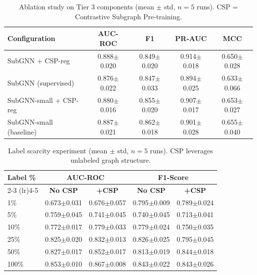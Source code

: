 \begin{table}[t]
\centering
\caption{Ablation study on Tier 3 components (mean $\pm$ std, $n=5$ runs). CSP = Contrastive Subgraph Pre-training.}
\label{tab:ablation}
\begin{tabular}{lcccc}
\toprule
\textbf{Configuration} & \textbf{AUC-ROC} & \textbf{F1} & \textbf{PR-AUC} & \textbf{MCC} \\
\midrule
SubGNN + CSP-reg               & 0.888$\pm$0.020 & 0.849$\pm$0.020 & 0.914$\pm$0.018 & 0.650$\pm$0.028 \\
SubGNN (supervised)            & 0.876$\pm$0.022 & 0.847$\pm$0.033 & 0.894$\pm$0.025 & 0.633$\pm$0.066 \\
SubGNN-small + CSP-reg         & 0.880$\pm$0.016 & 0.855$\pm$0.020 & 0.907$\pm$0.017 & 0.653$\pm$0.027 \\
SubGNN-small (baseline)        & 0.887$\pm$0.021 & 0.862$\pm$0.018 & 0.901$\pm$0.028 & 0.655$\pm$0.040 \\
\bottomrule
\end{tabular}
\end{table}

\begin{table}[t]
\centering
\caption{Label scarcity experiment (mean $\pm$ std, $n=5$ runs). CSP leverages unlabeled graph structure.}
\label{tab:label_scarcity}
\begin{tabular}{lcccc}
\toprule
\textbf{Label \%} & \multicolumn{2}{c}{\textbf{AUC-ROC}} & \multicolumn{2}{c}{\textbf{F1-Score}} \\
\cmidrule(lr){2-3} \cmidrule(lr){4-5}
 & \textbf{No CSP} & \textbf{+CSP} & \textbf{No CSP} & \textbf{+CSP} \\
\midrule
       1\% & 0.673$\pm$0.031 & 0.676$\pm$0.057 & 0.795$\pm$0.009 & 0.789$\pm$0.024 \\
       5\% & 0.759$\pm$0.045 & 0.741$\pm$0.045 & 0.740$\pm$0.045 & 0.713$\pm$0.041 \\
      10\% & 0.772$\pm$0.017 & 0.779$\pm$0.033 & 0.779$\pm$0.024 & 0.750$\pm$0.035 \\
      25\% & 0.825$\pm$0.020 & 0.832$\pm$0.013 & 0.826$\pm$0.025 & 0.795$\pm$0.045 \\
      50\% & 0.827$\pm$0.017 & 0.852$\pm$0.017 & 0.813$\pm$0.019 & 0.844$\pm$0.018 \\
     100\% & 0.853$\pm$0.010 & 0.867$\pm$0.008 & 0.843$\pm$0.022 & 0.843$\pm$0.026 \\
\bottomrule
\end{tabular}
\end{table}

